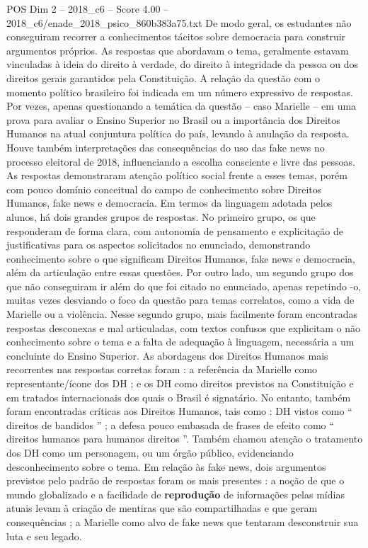 \begin{textsample}{POS Dim 2 – 2018\_c6 – Score 4.00 – 2018\_c6/enade\_2018\_psico\_860b383a75.txt}
De modo geral, os estudantes não conseguiram recorrer a conhecimentos tácitos sobre democracia para construir argumentos próprios.
As respostas que abordavam o tema, geralmente estavam vinculadas à ideia do direito à verdade, do direito à integridade da pessoa ou dos direitos gerais garantidos pela Constituição.
A relação da questão com o momento político brasileiro foi indicada em um número expressivo de respostas.
Por vezes, apenas questionando a temática da questão – caso Marielle – em uma prova para avaliar o Ensino Superior no Brasil ou a importância dos Direitos Humanos na atual conjuntura política do país, levando à anulação da resposta.
Houve também interpretações das consequências do uso das fake news no processo eleitoral de 2018, influenciando a escolha consciente e livre das pessoas.
As respostas demonstraram atenção político social frente a esses temas, porém com pouco domínio conceitual do campo de conhecimento sobre Direitos Humanos, fake news e democracia.
Em termos da linguagem adotada pelos alunos, há dois grandes grupos de respostas.
No primeiro grupo, os que responderam de forma clara, com autonomia de pensamento e explicitação de justificativas para os aspectos solicitados no enunciado, demonstrando conhecimento sobre o que significam Direitos Humanos, fake news e democracia, além da articulação entre essas questões.
Por outro lado, um segundo grupo dos que não conseguiram ir além do que foi citado no enunciado, apenas repetindo -o, muitas vezes desviando o foco da questão para temas correlatos, como a vida de Marielle ou a violência.
Nesse segundo grupo, mais facilmente foram encontradas respostas desconexas e mal articuladas, com textos confusos que explicitam o não conhecimento sobre o tema e a falta de adequação à linguagem, necessária a um concluinte do Ensino Superior.
As abordagens dos Direitos Humanos mais recorrentes nas respostas corretas foram : a referência da Marielle como representante/ícone dos DH ; e os DH como direitos previstos na Constituição e em tratados internacionais dos quais o Brasil é signatário.
No entanto, também foram encontradas críticas aos Direitos Humanos, tais como : DH vistos como “ direitos de bandidos ” ; a defesa pouco embasada de frases de efeito como “ direitos humanos para humanos direitos ”.
Também chamou atenção o tratamento dos DH como um personagem, ou um órgão público, evidenciando desconhecimento sobre o tema.
Em relação às fake news, dois argumentos previstos pelo padrão de respostas foram os mais presentes : a noção de que o mundo globalizado e a facilidade de \textbf{reprodução} de informações pelas mídias atuais levam à criação de mentiras que são compartilhadas e que geram consequências ; a Marielle como alvo de fake news que tentaram desconstruir sua luta e seu legado.

\end{textsample}

